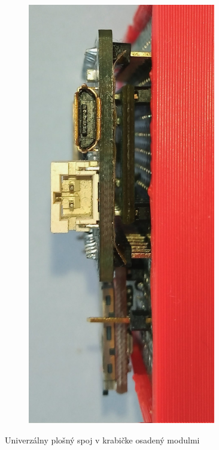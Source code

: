 \begin{figure}[h!]
\begin{subfigure}{0.2\textwidth}
    \includegraphics[width=0.9\textwidth]{figures/design/esp32-front.jpg}
\end{subfigure}
\caption{Univerzálny plošný spoj v krabičke osadený modulmi}
\label{board}
\end{figure}

